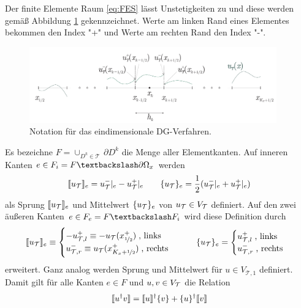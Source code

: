 Der finite Elemente Raum \eqref{eq:FES} lässt Unstetigkeiten zu und diese werden gemäß Abbildung \ref{fig:notation_DG} gekennzeichnet. Werte am linken Rand eines Elementes bekommen den Index "+" und Werte am rechten Rand den Index "-".
\begin{figure}
  \centering
  \includegraphics[width=0.95\textwidth]{files/notationDG.pdf}
  \caption{Notation für das eindimensionale DG-Verfahren.}
  \label{fig:notation_DG}
\end{figure}
\begin{definition}\label{def:jump}
Es bezeichne $F=\cup_{D^k\in\mathcal{T}} \, \partial D^k$ die Menge aller Elementkanten. Auf inneren Kanten $e\in F_i=F  \textbackslash \partial\Omega_x$ werden
\begin{equation}
  \llbracket u_{\mathcal{T}} \rrbracket_e = u_{\mathcal{T}}^-|_e - u_{\mathcal{T}}^+|_e \qquad \{ u_{\mathcal{T}} \}_e = \frac{1}{2} (u_{\mathcal{T}}^-|_e + u_{\mathcal{T}}^+|_e)
\end{equation}
als Sprung $\llbracket u_{\mathcal{T}} \rrbracket_e$ und Mittelwert $\{ u_{\mathcal{T}} \}_e$ von $u_{\mathcal{T}} \in V_{\mathcal{T}}$ definiert. Auf den zwei äußeren Kanten $e\in F_e = F \textbackslash F_i$ wird diese Definition durch
\begin{equation}
  \llbracket u_{\mathcal{T}} \rrbracket_e \equiv \begin{cases} -u_{\mathcal{T},l}^+ \equiv -u_{\mathcal{T}}(x_{\nicefrac{1}{2}}^+) \; \text{, links}\\ u_{\mathcal{T},r}^- \equiv u_{\mathcal{T}}(x_{K_x+\nicefrac{1}{2}}^+) \; \text{, rechts} \end{cases}
   \qquad \{ u_{\mathcal{T}} \}_e = \begin{cases} u_{\mathcal{T},l}^+ \; \text{, links}\\ u_{\mathcal{T},r}^- \; \text{, rechts}\\  \end{cases}
\end{equation}
erweitert. Ganz analog werden Sprung und Mittelwert für $u \in V_{\mathcal{T},1}$ definiert. Damit gilt für alle Kanten $e\in F$ und $u,v\in V_{\mathcal{T}}$ die Relation
\begin{equation}
  \llbracket u^{\dagger}v \rrbracket = \llbracket u \rrbracket^{\dagger}\{ v \} + \{ u \}^{\dagger}\llbracket v \rrbracket
  \label{eq:jump_relation}
\end{equation}
\end{definition}
